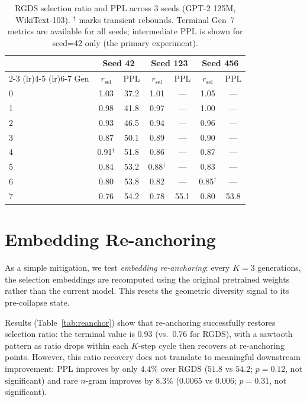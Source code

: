 \documentclass[11pt,a4paper]{article}
\newcommand{\ratio}{\ensuremath{r_{\text{sel}}}}
\begin{document}
\begin{table}[h]
\centering
\small
\begin{tabular}{lcccccc}
\toprule
& \multicolumn{2}{c}{Seed 42} & \multicolumn{2}{c}{Seed 123} & \multicolumn{2}{c}{Seed 456} \\
\cmidrule(lr){2-3} \cmidrule(lr){4-5} \cmidrule(lr){6-7}
Gen & $\ratio$ & PPL & $\ratio$ & PPL & $\ratio$ & PPL \\
\midrule
0 & 1.03 & 37.2 & 1.01 & --- & 1.05 & --- \\
1 & 0.98 & 41.8 & 0.97 & --- & 1.00 & --- \\
2 & 0.93 & 46.5 & 0.94 & --- & 0.96 & --- \\
3 & 0.87 & 50.1 & 0.89 & --- & 0.90 & --- \\
4 & 0.91$^\dagger$ & 51.8 & 0.86 & --- & 0.87 & --- \\
5 & 0.84 & 53.2 & 0.88$^\dagger$ & --- & 0.83 & --- \\
6 & 0.80 & 53.8 & 0.82 & --- & 0.85$^\dagger$ & --- \\
7 & 0.76 & 54.2 & 0.78 & 55.1 & 0.80 & 53.8 \\
\bottomrule
\end{tabular}
\caption{RGDS selection ratio and PPL across 3 seeds (GPT-2 125M, WikiText-103). $^\dagger$ marks transient rebounds. Terminal Gen~7 metrics are available for all seeds; intermediate PPL is shown for seed=42 only (the primary experiment).}
\label{tab:seed123}
\end{table}

\section{Embedding Re-anchoring}
\label{app:reanchor}

As a simple mitigation, we test \emph{embedding re-anchoring}: every $K{=}3$ generations, the selection embeddings are recomputed using the original pretrained weights rather than the current model.
This resets the geometric diversity signal to its pre-collapse state.

Results (Table~\ref{tab:reanchor}) show that re-anchoring successfully restores selection ratio: the terminal value is 0.93 (vs.\ 0.76 for RGDS), with a sawtooth pattern as ratio drops within each $K$-step cycle then recovers at re-anchoring points.
However, this ratio recovery does not translate to meaningful downstream improvement: PPL improves by only 4.4\% over RGDS ($51.8$ vs $54.2$; $p{=}0.12$, not significant) and rare $n$-gram improves by 8.3\% ($0.0065$ vs $0.006$; $p{=}0.31$, not significant).
\end{document}
